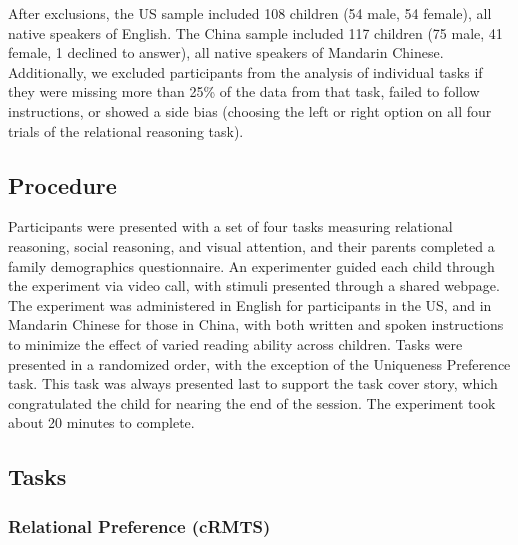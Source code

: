 \documentclass[10pt, letterpaper]{article}
\begin{document}
After exclusions, the US sample included 108 children (54 male, 54
female), all native speakers of English. The China sample included 117
children (75 male, 41 female, 1 declined to answer), all native speakers
of Mandarin Chinese. Additionally, we excluded participants from the
analysis of individual tasks if they were missing more than 25\% of the
data from that task, failed to follow instructions, or showed a side
bias (choosing the left or right option on all four trials of the
relational reasoning task).

\hypertarget{procedure}{%
\subsection{Procedure}\label{procedure}}

Participants were presented with a set of four tasks measuring
relational reasoning, social reasoning, and visual attention, and their
parents completed a family demographics questionnaire. An experimenter
guided each child through the experiment via video call, with stimuli
presented through a shared webpage. The experiment was administered in
English for participants in the US, and in Mandarin Chinese for those in
China, with both written and spoken instructions to minimize the effect
of varied reading ability across children. Tasks were presented in a
randomized order, with the exception of the Uniqueness Preference task.
This task was always presented last to support the task cover story,
which congratulated the child for nearing the end of the session. The
experiment took about 20 minutes to complete.

\hypertarget{tasks}{%
\subsection{Tasks}\label{tasks}}

\hypertarget{relational-preference-crmts}{%
\subsubsection{Relational Preference
(cRMTS)}\label{relational-preference-crmts}}
\end{document}
